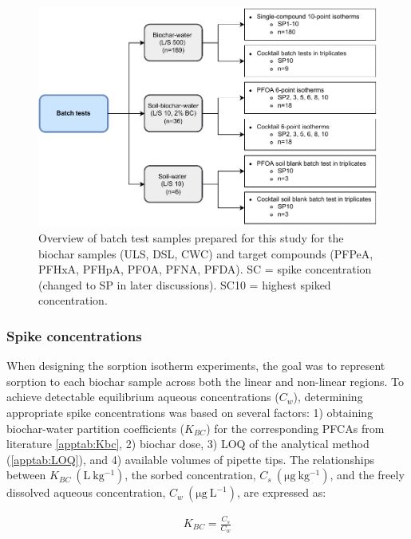 
\begin{figure}
    \centering
    \includegraphics{Diagrams/Methods-Page-9.pdf}
    \caption{Overview of batch test samples prepared for this study for the biochar samples (\acrshort{ULS}, \acrshort{DSL}, \acrshort{CWC}) and target compounds (\acrshort{PFPeA}, \acrshort{PFHxA}, \acrshort{PFHpA}, \acrshort{PFOA}, \acrshort{PFNA}, \acrshort{PFDA}). \acrshort{SC} = spike concentration (changed to SP in later discussions). SC10 = highest spiked concentration.}
    \label{fig:batchtests_flowchart}
\end{figure}
\subsubsection{Spike concentrations}
When designing the sorption isotherm experiments, the goal was to represent sorption to each biochar sample across both the linear and non-linear regions. To achieve detectable equilibrium aqueous concentrations ($C_w$), determining appropriate spike concentrations was based on several factors: 1) obtaining biochar-water partition coefficients ($K_{BC}$) for the corresponding PFCAs from literature \cite{Xiao2017} \cref{apptab:Kbc}, 2) biochar dose, 3) LOQ of the analytical method (\cref{apptab:LOQ}), and 4) available volumes of pipette tips. The relationships between $K_{BC}~\mathrm{(L~kg^{-1})}$, the sorbed concentration, $C_s~\mathrm{(\mu g~kg^{-1})}$, and the freely dissolved aqueous concentration, $C_w~\mathrm{(\mu g~L^{-1})}$, are expressed as:

\begin{align}
    \label{eq:Kbc1}
    K_{BC} = \frac{C_s}{C_w}
\end{align}

